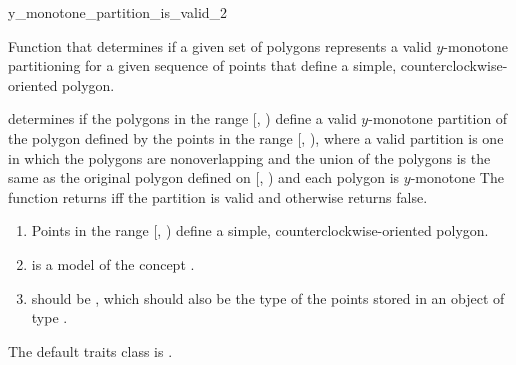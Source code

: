 \renewcommand\ccRefPageBegin{\ccParDims\cgalColumnLayout\begin{ccAdvanced}}
\renewcommand\ccRefPageEnd{\ccParDims\cgalColumnLayout\end{ccAdvanced}}
\begin{ccRefFunction}{y_monotone_partition_is_valid_2}

\ccDefinition
Function that determines if a given set of polygons represents
a valid $y$-monotone partitioning for a given sequence of points that 
define a simple, counterclockwise-oriented polygon.  


{
determines if the polygons in the range [, )
define a valid $y$-monotone partition of the polygon defined by the points 
in the 
range [, ), where a valid partition is one in
which the polygons are nonoverlapping and the union of the polygons is the 
same as the original polygon defined on [, )
and each polygon is $y$-monotone
The function returns  iff the partition is valid and otherwise
returns false.
}

\begin{enumerate}
    \item Points in the range [, ) define
          a simple, counterclockwise-oriented polygon.
    \item {} is a model of the concept 
          .
    \item {} should be ,
          which should also be the type of the points stored in an object
          of type .
\end{enumerate}

The default traits class  is .%


\end{ccRefFunction}
